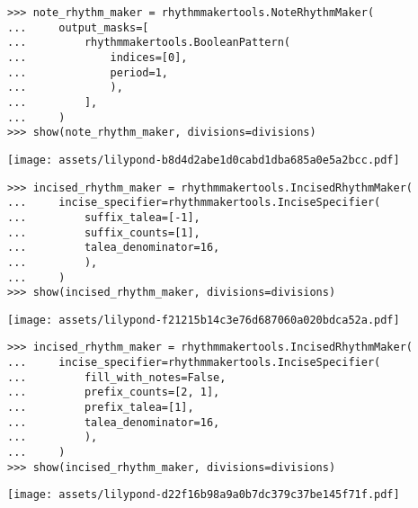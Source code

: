 \begin{singlespacing}
\vspace{-0.5\baselineskip}
\begin{lstlisting}
>>> note_rhythm_maker = rhythmmakertools.NoteRhythmMaker(
...     output_masks=[
...         rhythmmakertools.BooleanPattern(
...             indices=[0],
...             period=1,
...             ),
...         ],
...     )
>>> show(note_rhythm_maker, divisions=divisions)
\end{lstlisting}
\noindent\texttt{[image: assets/lilypond-b8d4d2abe1d0cabd1dba685a0e5a2bcc.pdf]}
\end{singlespacing}

\begin{comment}
<abjad>
incised_rhythm_maker = rhythmmakertools.IncisedRhythmMaker(
    incise_specifier=rhythmmakertools.InciseSpecifier(
        suffix_talea=[-1],
        suffix_counts=[1],
        talea_denominator=16,
        ),
    )
show(incised_rhythm_maker, divisions=divisions)
</abjad>
\end{comment}

\begin{singlespacing}
\vspace{-0.5\baselineskip}
\begin{lstlisting}
>>> incised_rhythm_maker = rhythmmakertools.IncisedRhythmMaker(
...     incise_specifier=rhythmmakertools.InciseSpecifier(
...         suffix_talea=[-1],
...         suffix_counts=[1],
...         talea_denominator=16,
...         ),
...     )
>>> show(incised_rhythm_maker, divisions=divisions)
\end{lstlisting}
\noindent\texttt{[image: assets/lilypond-f21215b14c3e76d687060a020bdca52a.pdf]}
\end{singlespacing}

\begin{comment}
<abjad>
incised_rhythm_maker = rhythmmakertools.IncisedRhythmMaker(
    incise_specifier=rhythmmakertools.InciseSpecifier(
        fill_with_notes=False,
        prefix_counts=[2, 1],
        prefix_talea=[1],
        talea_denominator=16,
        ),
    )
show(incised_rhythm_maker, divisions=divisions)
</abjad>
\end{comment}

\begin{singlespacing}
\vspace{-0.5\baselineskip}
\begin{lstlisting}
>>> incised_rhythm_maker = rhythmmakertools.IncisedRhythmMaker(
...     incise_specifier=rhythmmakertools.InciseSpecifier(
...         fill_with_notes=False,
...         prefix_counts=[2, 1],
...         prefix_talea=[1],
...         talea_denominator=16,
...         ),
...     )
>>> show(incised_rhythm_maker, divisions=divisions)
\end{lstlisting}
\noindent\texttt{[image: assets/lilypond-d22f16b98a9a0b7dc379c37be145f71f.pdf]}
\end{singlespacing}

